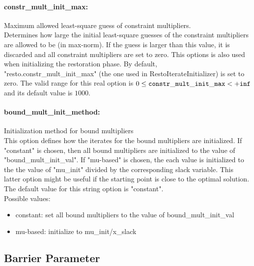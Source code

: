 \paragraph{constr\_mult\_init\_max:}\label{opt:constr_mult_init_max} Maximum allowed least-square guess of constraint multipliers. \\
 Determines how large the initial least-square
guesses of the constraint multipliers are allowed
to be (in max-norm). If the guess is larger than
this value, it is discarded and all constraint
multipliers are set to zero.  This options is
also used when initializing the restoration
phase. By default,
"resto.constr\_mult\_init\_max" (the one used in
RestoIterateInitializer) is set to zero. The valid range for this real option is 
$0 \le {\tt constr\_mult\_init\_max } <  {\tt +inf}$
and its default value is $1000$.


\paragraph{bound\_mult\_init\_method:}\label{opt:bound_mult_init_method} Initialization method for bound multipliers \\
 This option defines how the iterates for the
bound multipliers are initialized.  If "constant"
is chosen, then all bound multipliers are
initialized to the value of
"bound\_mult\_init\_val".  If "mu-based" is
chosen, the each value is initialized to the the
value of "mu\_init" divided by the corresponding
slack variable.  This latter option might be
useful if the starting point is close to the
optimal solution. The default value for this string option is "constant".
\\ 
Possible values:
\begin{itemize}
   \item constant: set all bound multipliers to the value of
bound\_mult\_init\_val
   \item mu-based: initialize to mu\_init/x\_slack
\end{itemize}

\subsection{Barrier Parameter}

